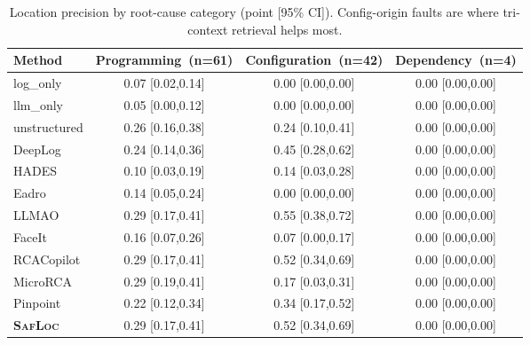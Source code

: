 \begin{table}[t]
  \centering
  \caption{Location precision by root-cause category (point [95\% CI]). Config-origin faults are where tri-context retrieval helps most.}
  \label{tab:percat_locprec}
  \setlength{\tabcolsep}{4pt}
  \footnotesize
  \begin{tabular}{lccc}
    \toprule
    Method & Programming~(n=61) & Configuration~(n=42) & Dependency~(n=4) \\
    \midrule
    log\_only & 0.07 [0.02,0.14] & 0.00 [0.00,0.00] & 0.00 [0.00,0.00] \\
    llm\_only & 0.05 [0.00,0.12] & 0.00 [0.00,0.00] & 0.00 [0.00,0.00] \\
    unstructured & 0.26 [0.16,0.38] & 0.24 [0.10,0.41] & 0.00 [0.00,0.00] \\
    DeepLog & 0.24 [0.14,0.36] & 0.45 [0.28,0.62] & 0.00 [0.00,0.00] \\
    HADES & 0.10 [0.03,0.19] & 0.14 [0.03,0.28] & 0.00 [0.00,0.00] \\
    Eadro & 0.14 [0.05,0.24] & 0.00 [0.00,0.00] & 0.00 [0.00,0.00] \\
    LLMAO & 0.29 [0.17,0.41] & 0.55 [0.38,0.72] & 0.00 [0.00,0.00] \\
    FaceIt & 0.16 [0.07,0.26] & 0.07 [0.00,0.17] & 0.00 [0.00,0.00] \\
    RCACopilot & 0.29 [0.17,0.41] & 0.52 [0.34,0.69] & 0.00 [0.00,0.00] \\
    MicroRCA & 0.29 [0.19,0.41] & 0.17 [0.03,0.31] & 0.00 [0.00,0.00] \\
    Pinpoint & 0.22 [0.12,0.34] & 0.34 [0.17,0.52] & 0.00 [0.00,0.00] \\
    \midrule
    \textbf{\textsc{SafLoc}} & 0.29 [0.17,0.41] & 0.52 [0.34,0.69] & 0.00 [0.00,0.00] \\
    \bottomrule
  \end{tabular}
\end{table}
